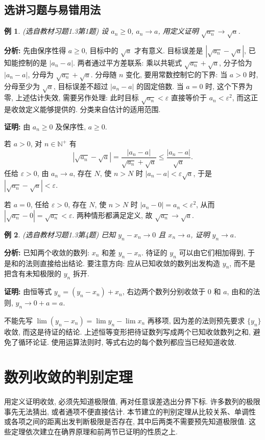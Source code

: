 \documentclass[UTF8,openany]{ctexbook}
\theoremstyle{chinesetextbook}
\newtheorem{example}{例}[section]
\newenvironment{cnproof}{\par\indent\textbf{证明:} \ignorespaces}{\par}
\begin{document}
\subsection{选讲习题与易错用法}
\begin{example}
\textnormal{(选自教材习题1.3第1题)} 设 $a_n\ge0$, $a_n\to a$, 用定义证明 $\sqrt{a_n}\to\sqrt a$.
\end{example}
\par\indent\textbf{分析:} 先由保序性得 $a\ge0$, 目标中的 $\sqrt a$ 才有意义. 目标误差是 $|\sqrt{a_n}-\sqrt a|$, 已知能控制的是 $|a_n-a|$. 两者通过平方差联系: 乘以共轭式 $\sqrt{a_n}+\sqrt a$, 分子恰为 $|a_n-a|$, 分母为 $\sqrt{a_n}+\sqrt a$. 分母随 $n$ 变化, 要用常数控制它的下界: 当 $a>0$ 时, 分母至少为 $\sqrt a$, 目标误差不超过 $|a_n-a|$ 的固定倍数. 当 $a=0$ 时, 这个下界为零, 上述估计失效, 需要另作处理: 此时目标 $\sqrt{a_n}<\varepsilon$ 直接等价于 $a_n<\varepsilon^2$, 而这正是收敛定义能够提供的. 分类来自估计的适用范围.
\begin{cnproof}
由 $a_n\ge0$ 及保序性, $a\ge0$.

若 $a>0$, 对 $n\in\mathbb N^+$ 有
\[
|\sqrt{a_n}-\sqrt a|
=\frac{|a_n-a|}{\sqrt{a_n}+\sqrt a}
\le\frac{|a_n-a|}{\sqrt a}.
\]
任给 $\varepsilon>0$, 由 $a_n\to a$, 存在 $N$, 使 $n>N$ 时 $|a_n-a|<\varepsilon\sqrt a$, 于是 $|\sqrt{a_n}-\sqrt a|<\varepsilon$.

若 $a=0$, 任给 $\varepsilon>0$, 存在 $N$, 使 $n>N$ 时 $|a_n-0|=a_n<\varepsilon^2$, 从而 $|\sqrt{a_n}-0|=\sqrt{a_n}<\varepsilon$. 两种情形都满足定义, 故 $\sqrt{a_n}\to\sqrt a$.
\end{cnproof}
\begin{example}
\textnormal{(选自教材习题1.3第4题)} 已知 $y_n-x_n\to0$ 且 $x_n\to a$, 证明 $y_n\to a$.
\end{example}
\par\indent\textbf{分析:} 已知两个收敛的数列: $x_n$ 和差 $y_n-x_n$. 待证的 $y_n$ 可以由它们相加得到, 于是和的法则直接给出结论. 要注意方向: 应从已知收敛的数列出发构造 $y_n$, 而不是把含有未知极限的 $y_n$ 拆开.
\begin{cnproof}
由恒等式 $y_n=(y_n-x_n)+x_n$, 右边两个数列分别收敛于 $0$ 和 $a$, 由和的法则, $y_n\to0+a=a$.
\end{cnproof}
不能先写 $\lim(y_n-x_n)=\lim y_n-\lim x_n$ 再移项, 因为差的法则预先要求 $\{y_n\}$ 收敛, 而这是待证的结论. 上述恒等变形把待证数列写成两个已知收敛数列之和, 避免了循环论证. 使用运算法则时, 等式右边的每个数列都应当已经知道收敛.
\section{数列收敛的判别定理}
用定义证明收敛, 必须先知道极限值, 再对任意误差选出分界下标. 许多数列的极限事先无法猜出, 或者通项不便直接估计. 本节建立的判别定理从比较关系、单调性或各项之间的距离出发判断极限是否存在, 其中后两类不需要预先知道极限值. 这些定理依次建立在确界原理和前两节已证明的性质之上.
\end{document}
